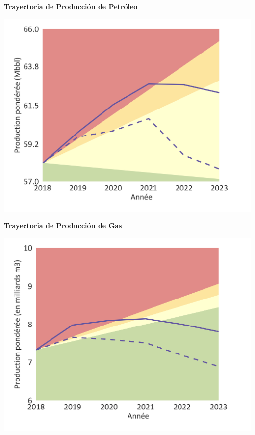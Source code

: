 \documentclass[10pt,table]{article}\usepackage[]{graphicx}\usepackage[]{color}
\begin{document}
	\begin{minipage}[t]{.49\linewidth}
		\textbf{Trayectoria de Producción de Petróleo}
		
		\includegraphics[trim = {0 0cm 0 0},width=1\linewidth]{ReportOutputs/Fig11}
		
	\end{minipage}	
	\hspace{.02\linewidth}
	\begin{minipage}[t]{.49\textwidth}
		\textbf{Trayectoria de Producción de Gas }
		
		\includegraphics[trim = {0 0cm 0 0},width=1\linewidth]{ReportOutputs/Fig12}
		
	\end{minipage}
	
\end{document}
